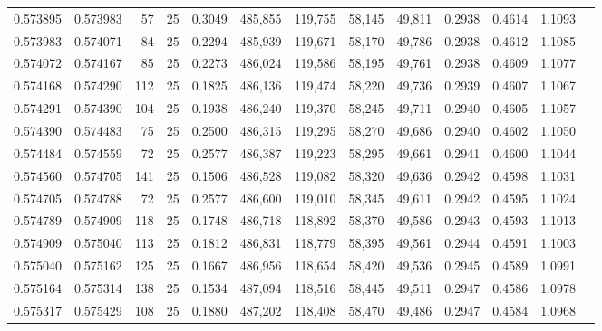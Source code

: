 \begin{tabular}{rrrrrrrrrrrrr}
0.573895 & 0.573983 &    57 &  25 &                                     0.3049 & 485,855 & 119,755 &  58,145 &  49,811 & 0.2938 & 0.4614 & 1.1093 \\
0.573983 & 0.574071 &    84 &  25 &                                     0.2294 & 485,939 & 119,671 &  58,170 &  49,786 & 0.2938 & 0.4612 & 1.1085 \\
0.574072 & 0.574167 &    85 &  25 &                                     0.2273 & 486,024 & 119,586 &  58,195 &  49,761 & 0.2938 & 0.4609 & 1.1077 \\
0.574168 & 0.574290 &   112 &  25 &                                     0.1825 & 486,136 & 119,474 &  58,220 &  49,736 & 0.2939 & 0.4607 & 1.1067 \\
0.574291 & 0.574390 &   104 &  25 &                                     0.1938 & 486,240 & 119,370 &  58,245 &  49,711 & 0.2940 & 0.4605 & 1.1057 \\
0.574390 & 0.574483 &    75 &  25 &                                     0.2500 & 486,315 & 119,295 &  58,270 &  49,686 & 0.2940 & 0.4602 & 1.1050 \\
0.574484 & 0.574559 &    72 &  25 &                                     0.2577 & 486,387 & 119,223 &  58,295 &  49,661 & 0.2941 & 0.4600 & 1.1044 \\
0.574560 & 0.574705 &   141 &  25 &                                     0.1506 & 486,528 & 119,082 &  58,320 &  49,636 & 0.2942 & 0.4598 & 1.1031 \\
0.574705 & 0.574788 &    72 &  25 &                                     0.2577 & 486,600 & 119,010 &  58,345 &  49,611 & 0.2942 & 0.4595 & 1.1024 \\
0.574789 & 0.574909 &   118 &  25 &                                     0.1748 & 486,718 & 118,892 &  58,370 &  49,586 & 0.2943 & 0.4593 & 1.1013 \\
0.574909 & 0.575040 &   113 &  25 &                                     0.1812 & 486,831 & 118,779 &  58,395 &  49,561 & 0.2944 & 0.4591 & 1.1003 \\
0.575040 & 0.575162 &   125 &  25 &                                     0.1667 & 486,956 & 118,654 &  58,420 &  49,536 & 0.2945 & 0.4589 & 1.0991 \\
0.575164 & 0.575314 &   138 &  25 &                                     0.1534 & 487,094 & 118,516 &  58,445 &  49,511 & 0.2947 & 0.4586 & 1.0978 \\
0.575317 & 0.575429 &   108 &  25 &                                     0.1880 & 487,202 & 118,408 &  58,470 &  49,486 & 0.2947 & 0.4584 & 1.0968 \\

\end{tabular}
